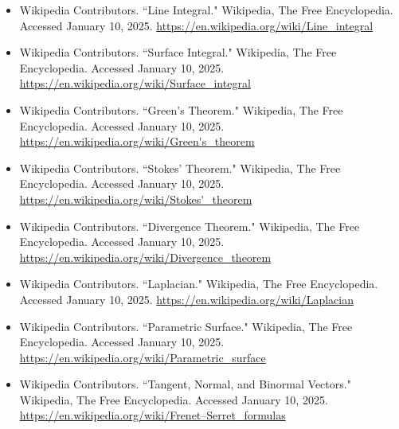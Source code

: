 \begin{itemize}
    \item Wikipedia Contributors. ``Line Integral." Wikipedia, The Free Encyclopedia. Accessed January 10, 2025. \url{https://en.wikipedia.org/wiki/Line_integral}
    \item Wikipedia Contributors. ``Surface Integral." Wikipedia, The Free Encyclopedia. Accessed January 10, 2025. \url{https://en.wikipedia.org/wiki/Surface_integral}
    \item Wikipedia Contributors. ``Green's Theorem." Wikipedia, The Free Encyclopedia. Accessed January 10, 2025. \url{https://en.wikipedia.org/wiki/Green's_theorem}
    \item Wikipedia Contributors. ``Stokes' Theorem." Wikipedia, The Free Encyclopedia. Accessed January 10, 2025. \url{https://en.wikipedia.org/wiki/Stokes'_theorem}
    \item Wikipedia Contributors. ``Divergence Theorem." Wikipedia, The Free Encyclopedia. Accessed January 10, 2025. \url{https://en.wikipedia.org/wiki/Divergence_theorem}
    \item Wikipedia Contributors. ``Laplacian." Wikipedia, The Free Encyclopedia. Accessed January 10, 2025. \url{https://en.wikipedia.org/wiki/Laplacian}
    \item Wikipedia Contributors. ``Parametric Surface." Wikipedia, The Free Encyclopedia. Accessed January 10, 2025. \url{https://en.wikipedia.org/wiki/Parametric_surface}
    \item Wikipedia Contributors. ``Tangent, Normal, and Binormal Vectors." Wikipedia, The Free Encyclopedia. Accessed January 10, 2025. \url{https://en.wikipedia.org/wiki/Frenet–Serret_formulas}
\end{itemize}